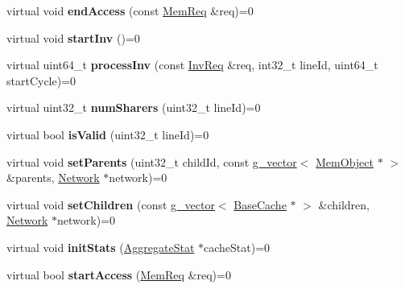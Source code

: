 \begin{DoxyCompactItemize}
\item 
\hypertarget{classCC_a66848e057fd8894a77a28e797dbc155c}{virtual void {\bfseries end\-Access} (const \hyperlink{structMemReq}{Mem\-Req} \&req)=0}\label{classCC_a66848e057fd8894a77a28e797dbc155c}

\item 
\hypertarget{classCC_ac2219b6d1f3fea343d37c80cee92b93a}{virtual void {\bfseries start\-Inv} ()=0}\label{classCC_ac2219b6d1f3fea343d37c80cee92b93a}

\item 
\hypertarget{classCC_aa3689bb729527bf2ced5a7020f9fdf65}{virtual uint64\-\_\-t {\bfseries process\-Inv} (const \hyperlink{structInvReq}{Inv\-Req} \&req, int32\-\_\-t line\-Id, uint64\-\_\-t start\-Cycle)=0}\label{classCC_aa3689bb729527bf2ced5a7020f9fdf65}

\item 
\hypertarget{classCC_a369786ed281101d04db2d841b21fd58f}{virtual uint32\-\_\-t {\bfseries num\-Sharers} (uint32\-\_\-t line\-Id)=0}\label{classCC_a369786ed281101d04db2d841b21fd58f}

\item 
\hypertarget{classCC_ad27aac34c05038196e4b59ce97e63a71}{virtual bool {\bfseries is\-Valid} (uint32\-\_\-t line\-Id)=0}\label{classCC_ad27aac34c05038196e4b59ce97e63a71}

\item 
\hypertarget{classCC_a6b9d8a6acc32a2c279601078105ba94a}{virtual void {\bfseries set\-Parents} (uint32\-\_\-t child\-Id, const \hyperlink{classg__vector}{g\-\_\-vector}$<$ \hyperlink{classMemObject}{Mem\-Object} $\ast$ $>$ \&parents, \hyperlink{classNetwork}{Network} $\ast$network)=0}\label{classCC_a6b9d8a6acc32a2c279601078105ba94a}

\item 
\hypertarget{classCC_adcf73db25d1a7f19d875702cbd7d8da9}{virtual void {\bfseries set\-Children} (const \hyperlink{classg__vector}{g\-\_\-vector}$<$ \hyperlink{classBaseCache}{Base\-Cache} $\ast$ $>$ \&children, \hyperlink{classNetwork}{Network} $\ast$network)=0}\label{classCC_adcf73db25d1a7f19d875702cbd7d8da9}

\item 
\hypertarget{classCC_ad7b4e368967adaaab4fa63d5959ddbfe}{virtual void {\bfseries init\-Stats} (\hyperlink{classAggregateStat}{Aggregate\-Stat} $\ast$cache\-Stat)=0}\label{classCC_ad7b4e368967adaaab4fa63d5959ddbfe}

\item 
\hypertarget{classCC_a9637d8220e3588e4b7fd0460b1d2475a}{virtual bool {\bfseries start\-Access} (\hyperlink{structMemReq}{Mem\-Req} \&req)=0}\label{classCC_a9637d8220e3588e4b7fd0460b1d2475a}


\end{DoxyCompactItemize}
